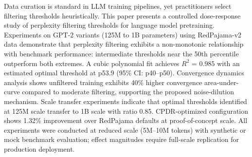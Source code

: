
Data curation is standard in LLM training pipelines, yet practitioners select filtering thresholds heuristically. This paper presents a controlled dose-response study of perplexity filtering thresholds for language model pretraining. Experiments on GPT-2 variants (125M to 1B parameters) using RedPajama-v2 data demonstrate that perplexity filtering exhibits a non-monotonic relationship with benchmark performance: intermediate thresholds near the 50th percentile outperform both extremes. A cubic polynomial fit achieves $R^2$ = 0.985 with an estimated optimal threshold at p53.9 (95\% CI: p40--p50). Convergence dynamics analysis shows unfiltered training exhibits 40\% higher convergence area-under-curve compared to moderate filtering, supporting the proposed noise-dilution mechanism. Scale transfer experiments indicate that optimal thresholds identified at 125M scale transfer to 1B scale with ratio 0.85. CPDR-optimized configuration shows 1.32\% improvement over RedPajama defaults at proof-of-concept scale. All experiments were conducted at reduced scale (5M--10M tokens) with synthetic or mock benchmark evaluation; effect magnitudes require full-scale replication for production deployment.
